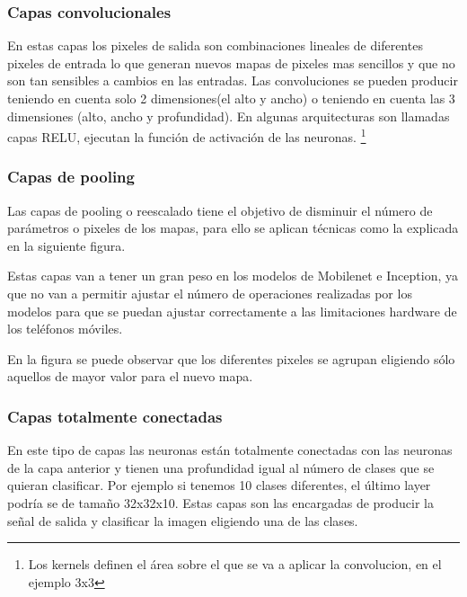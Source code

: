 \subsubsection{Capas convolucionales}

En estas capas los pixeles de salida son combinaciones lineales de diferentes pixeles de entrada lo que generan nuevos mapas de pixeles mas sencillos y que no son tan sensibles a cambios en las entradas. Las convoluciones se pueden producir teniendo en cuenta solo 2 dimensiones(el alto y ancho) o teniendo en cuenta las 3 dimensiones (alto, ancho y profundidad). En algunas arquitecturas son llamadas capas RELU, ejecutan la función de activación de las neuronas.
  \footnote{Los kernels definen el área sobre el que se va a aplicar la convolucion, en el ejemplo 3x3}

\subsubsection{Capas de pooling}

Las capas de pooling o reescalado tiene el objetivo de disminuir el número de parámetros o pixeles de los mapas, para ello se aplican técnicas como la explicada en la siguiente figura.

Estas capas van a tener un gran peso en los modelos de Mobilenet e Inception, ya que no van a permitir ajustar el número de operaciones realizadas por los modelos para que se puedan ajustar correctamente a las limitaciones hardware de los teléfonos móviles.


En la figura se puede observar que los diferentes pixeles se agrupan eligiendo sólo aquellos de mayor valor para el nuevo mapa.

\subsubsection{Capas totalmente conectadas}

En este tipo de capas las neuronas están totalmente conectadas con las neuronas de la capa anterior y tienen una profundidad igual al número de clases que se quieran clasificar. Por ejemplo si tenemos 10 clases diferentes, el último layer podría se de tamaño 32x32x10. Estas capas son las encargadas de producir la señal de salida y clasificar la imagen eligiendo una de las clases. 

